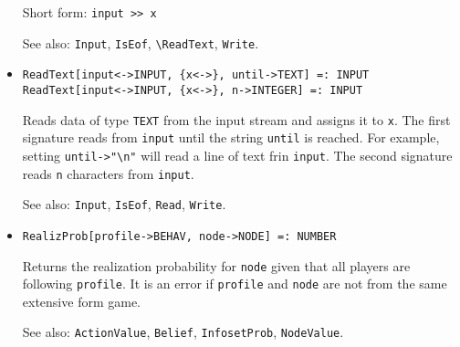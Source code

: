 \begin{itemize}
{\it for} {\tt T = BOOLEAN, NUMBER, TEXT}
\bd
Reads data of type \verb+T+ from the input stream and assigns it to
\verb+x+.  If \verb+x+ is undefined, then its data type is determined
from the exposed data in the input stream.  If \verb+x+ is previously
defined, then the \verb+Read+ function will expect to find the
corresponding data type in the input stream, and a file read error
will be generated if the exposed data is of the wrong data type.  If
\verb+x+ is previously defined to be a \verb+LIST+, then \verb+Read[in,x]+
will successively read elements into each element of the list.  If the
wrong data type is found for any element of the list, a file read
error will be returned.

The ``exposed data'' in the input stream consists of the following: If
first character is a double quote (\verb+"+), then the exposed data
consists of all characters up until the next double quote.  If the
first character is a \verb+{+, then the exposed data consists of all
the characters up until the next matching \verb+}+.  Otherwise, the
exposed data consists of all characters until the next whitespace.
\item [Short form:] \verb+input >> x+
\item [See also:] \verb+Input+, \verb+IsEof+, \verb+\ReadText+, 
\verb+Write+.
\ed

\item{}
\protect \large \begin{verbatim}
ReadText[input<->INPUT, {x<->}, until->TEXT] =: INPUT
ReadText[input<->INPUT, {x<->}, n->INTEGER] =: INPUT
\end{verbatim}\normalsize

\bd 
Reads data of type \verb+TEXT+ from the input stream and assigns it to
\verb+x+.  The first signature reads from \verb+input+ until the
string \verb+until+ is reached.  For example, setting
\verb+until->"\n"+ will read a line of text frin \verb+input+.  The
second signature reads \verb+n+ characters from \verb+input+.  
\item [See also:] \verb+Input+, \verb+IsEof+, \verb+Read+, \verb+Write+.
\ed

\item{}
\protect \large \begin{verbatim}
RealizProb[profile->BEHAV, node->NODE] =: NUMBER 
\end{verbatim}\normalsize

\bd
Returns the realization probability for \verb+node+ given that all players
are following \verb+profile+.  It is an error if \verb+profile+ and
\verb+node+ are not from the same extensive form game.
\item [See also:] \verb+ActionValue+, \verb+Belief+, \verb+InfosetProb+,
\verb+NodeValue+.
\ed


\end{itemize}
